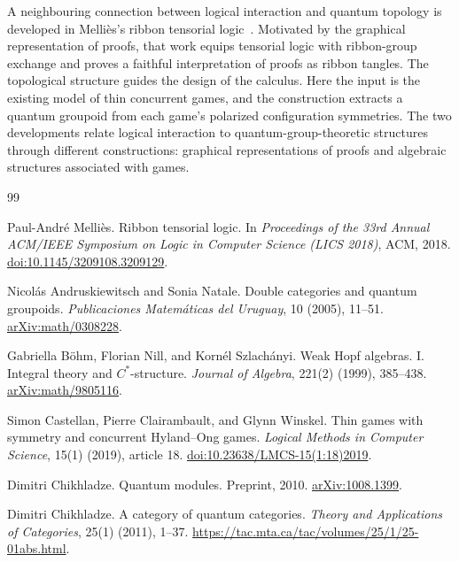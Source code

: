 \documentclass[oneside]{article}
\theoremstyle{plain}
\theoremstyle{definition}
\theoremstyle{remark}
\begin{document}
A neighbouring connection between logical interaction and quantum
topology is developed in Melli\`es's ribbon tensorial
logic~\cite{Mellies2018RibbonTensorialLogic}. Motivated by the graphical
representation of proofs, that work equips tensorial logic with
ribbon-group exchange and proves a faithful interpretation of proofs as
ribbon tangles. The topological structure guides the design of the
calculus. Here the input is the existing model of thin concurrent games,
and the construction extracts a quantum groupoid from each game's
polarized configuration symmetries. The two developments relate logical
interaction to quantum-group-theoretic structures through different
constructions: graphical representations of proofs and algebraic
structures associated with games.

\begin{thebibliography}{99}

Paul-Andr\'e Melli\`es.
Ribbon tensorial logic.
In \emph{Proceedings of the 33rd Annual ACM/IEEE Symposium on
Logic in Computer Science (LICS 2018)}, ACM, 2018.
\href{https://doi.org/10.1145/3209108.3209129}
     {doi:10.1145/3209108.3209129}.

Nicol\'as Andruskiewitsch and Sonia Natale.
Double categories and quantum groupoids.
\emph{Publicaciones Matem\'aticas del Uruguay}, 10 (2005), 11--51.
\href{https://arxiv.org/abs/math/0308228}{arXiv:math/0308228}.

Gabriella B\"ohm, Florian Nill, and Korn\'el Szlach\'anyi.
Weak Hopf algebras. I. Integral theory and \(C^*\)-structure.
\emph{Journal of Algebra}, 221(2) (1999), 385--438.
\href{https://arxiv.org/abs/math/9805116}{arXiv:math/9805116}.

Simon Castellan, Pierre Clairambault, and Glynn Winskel.
Thin games with symmetry and concurrent Hyland--Ong games.
\emph{Logical Methods in Computer Science}, 15(1) (2019), article 18.
\href{https://doi.org/10.23638/LMCS-15(1:18)2019}{doi:10.23638/LMCS-15(1:18)2019}.

Dimitri Chikhladze.
Quantum modules.
Preprint, 2010.
\href{https://arxiv.org/abs/1008.1399}{arXiv:1008.1399}.

Dimitri Chikhladze.
A category of quantum categories.
\emph{Theory and Applications of Categories}, 25(1) (2011), 1--37.
\url{https://tac.mta.ca/tac/volumes/25/1/25-01abs.html}.


\end{thebibliography}
\end{document}
